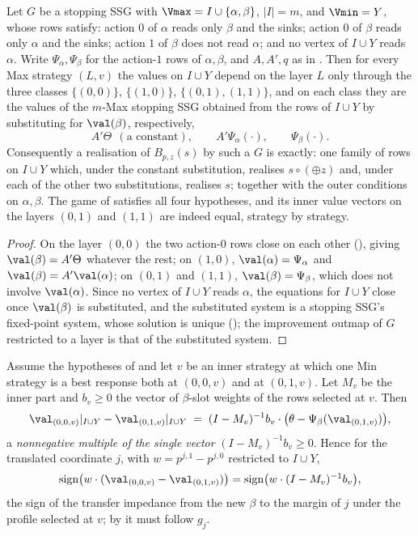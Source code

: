 \begin{proposition}\label{b3:decompose}
Let $G$ be a stopping SSG with $\Vmax=I\cup\{\alpha,\beta\}$, $|I|=m$, and
$\Vmin=Y$, whose rows satisfy: action $0$ of $\alpha$ reads only $\beta$ and
the sinks; action $0$ of $\beta$ reads only $\alpha$ and the sinks; action $1$
of $\beta$ does not read $\alpha$; and no vertex of $I\cup Y$ reads $\alpha$.
Write $\Psi_\alpha,\Psi_\beta$ for the action-$1$ rows of $\alpha,\beta$, and
$A,A',q$ as in . Then for every Max strategy $(L,v)$ the
values on $I\cup Y$ depend on the layer $L$ only through the three classes
$\{(0,0)\}$, $\{(1,0)\}$, $\{(0,1),(1,1)\}$, and on each class they are the
values of the $m$-Max stopping SSG obtained from the rows of $I\cup Y$ by
substituting for $\val(\beta)$, respectively,
\[
  A'\Theta \ \ (\text{a constant}),\qquad A'\Psi_\alpha(\cdot),\qquad
  \Psi_\beta(\cdot).
\]
Consequently a realisation of $B_{p,z}(s)$ by such a $G$ is exactly: one family
of rows on $I\cup Y$ which, under the constant substitution, realises
$s\circ(\oplus z)$ and, under each of the other two substitutions, realises
$s$; together with the outer conditions on $\alpha,\beta$. The game of
 satisfies all four hypotheses, and its inner value
vectors on the layers $(0,1)$ and $(1,1)$ are indeed equal, strategy by
strategy.
\end{proposition}

\begin{proof}
On the layer $(0,0)$ the two action-$0$ rows close on each other
(), giving $\val(\beta)=A'\Theta$ whatever the rest; on
$(1,0)$, $\val(\alpha)=\Psi_\alpha$ and $\val(\beta)=A'\val(\alpha)$; on
$(0,1)$ and $(1,1)$, $\val(\beta)=\Psi_\beta$, which does not involve
$\val(\alpha)$. Since no vertex of $I\cup Y$ reads $\alpha$, the equations for
$I\cup Y$ close once $\val(\beta)$ is substituted, and the substituted system
is a stopping SSG's fixed-point system, whose solution is unique
(); the improvement outmap of $G$ restricted to a layer
is that of the substituted system.
\end{proof}

\begin{lemma}\label{b3:rise-direction}
Assume the hypotheses of  and let $v$ be an inner strategy
at which one Min strategy is a best response both at $(0,0,v)$ and at
$(0,1,v)$. Let $M_v$ be the inner part and $b_v\ge0$ the vector of
$\beta$-slot weights of the rows selected at $v$. Then
\[
  \val_{(0,0,v)}|_{I\cup Y}-\val_{(0,1,v)}|_{I\cup Y}
  \;=\;(I-M_v)^{-1}b_v\cdot\bigl(\theta-\Psi_\beta(\val_{(0,1,v)})\bigr),
\]
a \emph{nonnegative multiple of the single vector} $(I-M_v)^{-1}b_v\ge0$. Hence
for the translated coordinate $j$, with $w=p^{j,1}-p^{j,0}$ restricted to
$I\cup Y$,
\[
  \operatorname{sign}\bigl(w\cdot(\val_{(0,0,v)}-\val_{(0,1,v)})\bigr)
  =\operatorname{sign}\bigl(w\cdot(I-M_v)^{-1}b_v\bigr),
\]
the sign of the transfer impedance from the new $\beta$ to the margin of $j$
under the profile selected at $v$; by  it must follow $g_j$.
\end{lemma}

